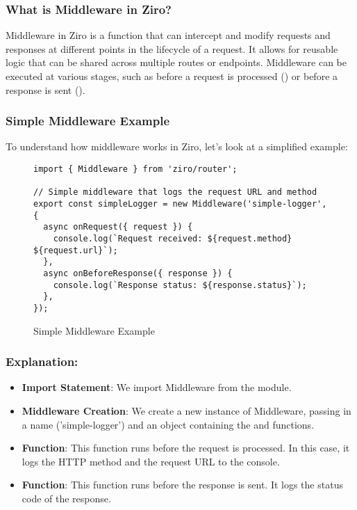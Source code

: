\subsubsection*{What is Middleware in Ziro?}
Middleware in Ziro is a function that can intercept and modify requests and responses at different points in the lifecycle of a request. It allows for reusable logic that can be shared across multiple routes or endpoints. Middleware can be executed at various stages, such as before a request is processed () or before a response is sent ().

\subsubsection*{Simple Middleware Example}
To understand how middleware works in Ziro, let’s look at a simplified example:
\begin{figure}[h!]
\begin{verbatim}
import { Middleware } from 'ziro/router';

// Simple middleware that logs the request URL and method
export const simpleLogger = new Middleware('simple-logger', {
  async onRequest({ request }) {
    console.log(`Request received: ${request.method} ${request.url}`);
  },
  async onBeforeResponse({ response }) {
    console.log(`Response status: ${response.status}`);
  },
});
\end{verbatim}
\caption{Simple Middleware Example}
\end{figure}

\subsubsection*{Explanation:}

\begin{itemize}
  \item \textbf{Import Statement}: We import Middleware from the  module.
  \item \textbf{Middleware Creation}: We create a new instance of Middleware, passing in a name ('simple-logger') and an object containing the  and  functions.
  \item \textbf{ Function}: This function runs before the request is processed. In this case, it logs the HTTP method and the request URL to the console.
  \item \textbf{ Function}: This function runs before the response is sent. It logs the status code of the response.
\end{itemize}


